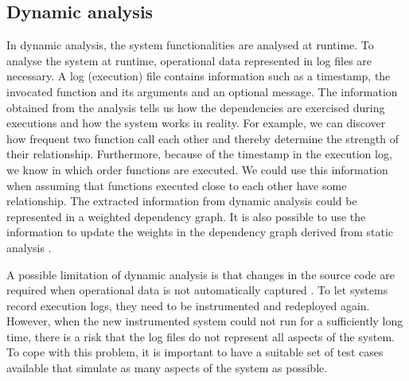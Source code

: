 \subsection{Dynamic analysis}
In dynamic analysis, the system functionalities are analysed at runtime. To analyse the system at runtime, operational data represented in log files are necessary. A log (execution) file contains information such as a timestamp, the invocated function and its arguments and an optional message. The information obtained from the analysis tells us how the dependencies are exercised during executions and how the system works in reality. For example, we can discover how frequent two function call each other and thereby determine the strength of their relationship. Furthermore, because of the timestamp in the execution log, we know in which order functions are executed. We could use this information when assuming that functions executed close to each other have some relationship. The extracted information from dynamic analysis could be represented in a weighted dependency graph. It is also possible to use the information to update the weights in the dependency graph derived from static analysis \cite{matias2020determining}. \par
A possible limitation of dynamic analysis is that changes in the source code are required when operational data is not automatically captured \cite{alsarhan2020software}. To let systems record execution logs, they need to be instrumented and redeployed again. However, when the new instrumented system could not run for a sufficiently long time, there is a risk that the log files do not represent all aspects of the system. To cope with this problem, it is important to have a suitable set of test cases available that simulate as many aspects of the system as possible. 

